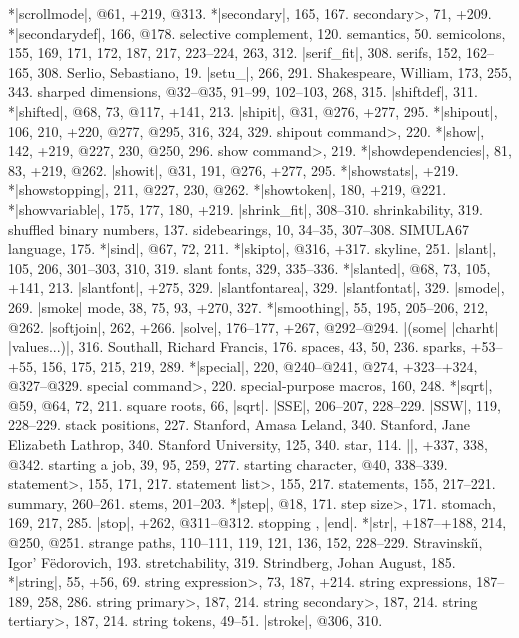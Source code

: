*|scrollmode|, @61, +219, @313.
*|secondary|, 165, 167.
\<secondary>, 71, +209.
*|secondarydef|, 166, @178.
selective complement, 120.
semantics, 50.
semicolons, 155, 169, 171, 172, 187, 217, 223--224, 263, 312.
|serif_fit|, 308.
serifs, 152, 162--165, 308.
Serlio, Sebastiano, 19.
|setu_|, 266, 291.
Shakespeare, William, 173, 255, 343.
sharped dimensions, @32--@35, 91--99, 102--103, 268, 315.
|shiftdef|, 311.
*|shifted|, @68, 73, @117, +141, 213.
|shipit|, @31, @276, +277, 295.
*|shipout|, 106, 210, +220, @277, @295, 316, 324, 329.
\<shipout command>, 220.
*|show|, 142, +219, @227, 230, @250, 296.
\<show command>, 219.
*|showdependencies|, 81, 83, +219, @262.
|showit|, @31, 191, @276, +277, 295.
*|showstats|, +219.
*|showstopping|, 211, @227, 230, @262.
*|showtoken|, 180, +219, @221.
*|showvariable|, 175, 177, 180, +219.
|shrink_fit|, 308--310.
shrinkability, 319.
shuffled binary numbers, 137.
sidebearings, 10, 34--35, 307--308.
{\sevenrm SIMULA67} language, 175.
*|sind|, @67, 72, 211.
*|skipto|, @316, +317.
skyline, 251.
|slant|, 105, 206, 301--303, 310, 319.
slant fonts, 329, 335--336.
*|slanted|, @68, 73, 105, +141, 213.
|slantfont|, +275, 329.
|slantfontarea|, 329.
|slantfontat|, 329.
|smode|, 269.
|smoke| mode, 38, 75, 93, +270, 327.
*|smoothing|, 55, 195, 205--206, 212, @262.
|softjoin|, 262, +266.
|solve|, 176--177, +267, @292--@294.
|(some| |charht| |values...)|, 316.
Southall, Richard Francis, 176.
spaces, 43, 50, 236.
sparks, +53--+55, 156, 175, 215, 219, 289.
*|special|, 220, @240--@241, @274, +323--+324, @327--@329.
\<special command>, 220.
special-purpose macros, 160, 248.
*|sqrt|, @59, @64, 72, 211.
square roots, 66, \also |sqrt|.
|SSE|, 206--207, 228--229.
|SSW|, 119, 228--229.
stack positions, 227.
Stanford, Amasa Leland, 340.
Stanford, Jane Elizabeth Lathrop, 340.
Stanford University, 125, 340.
star, 114.
|\startfont|, +337, 338, @342.
starting a job, 39, 95, 259, 277.
starting character, @40, 338--339.
\<statement>, 155, 171, 217.
\<statement list>, 155, 217.
statements, 155, 217--221.
\sub summary, 260--261.
stems, 201--203.
*|step|, @18, 171.
\<step size>, 171.
stomach, 169, 217, 285.
|stop|, +262, @311--@312.
stopping \MF, \see |end|.
*|str|, +187--+188, 214, @250, @251.
strange paths, 110--111, 119, 121, 136, 152, 228--229.
Stravinski{\u\i}, Igor' F\"edorovich, 193.
stretchability, 319.
Strindberg, Johan August, 185.
*|string|, 55, +56, 69.
\<string expression>, 73, 187, +214.
string expressions, 187--189, 258, 286.
\<string primary>, 187, 214.
\<string secondary>, 187, 214.
\<string tertiary>, 187, 214.
string tokens, 49--51.
|stroke|, @306, 310.
